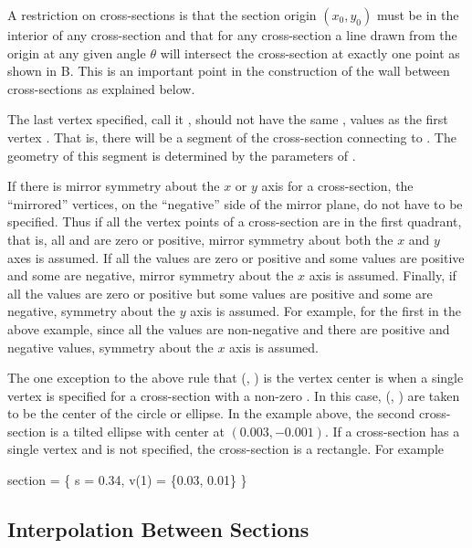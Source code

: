A restriction on cross-sections is that the section origin $(x_0,
y_0)$ must be in the interior of any cross-section and that for any
cross-section a line drawn from the origin at any given angle $\theta$
will intersect the cross-section at exactly one point as shown in
B. This is an important point in the construction
of the wall between cross-sections as explained below.

The last vertex specified, call it , should not have the
same ,  values as the first vertex . That
is, there will be a segment of the cross-section connecting
 to . The geometry of this segment is determined
by the parameters of .

If there is mirror symmetry about the $x$ or $y$ axis for a
cross-section, the ``mirrored'' vertices, on the ``negative'' side of
the mirror plane, do not have to be specified. Thus if all the vertex
points of a cross-section are in the first quadrant, that is, all
 and  are zero or positive, mirror symmetry about both the
$x$ and $y$ axes is assumed. If all the  values are zero or
positive and some  values are positive and some are negative,
mirror symmetry about the $x$ axis is assumed. Finally, if all the
 values are zero or positive but some  values are
positive and some are negative, symmetry about the $y$ axis is
assumed. For example, for the first in the above example, since
all the  values are non-negative and there are positive and
negative  values, symmetry about the $x$ axis is assumed.

The one exception to the above rule that (, ) is the
vertex center is when a single vertex  is specified for a
cross-section with a non-zero . In this case,
(, ) are taken to be the center of the circle or
ellipse. In the example above, the second cross-section is a
tilted ellipse with center at $(0.003, -0.001)$. If a cross-section
has a single vertex and  is
not specified, the cross-section is a rectangle. For example
\begin{example}
    section = \{ s = 0.34, v(1) = \{0.03, 0.01\} \}
\end{example}

\subsection{Interpolation Between Sections}
\label{s:wall.interpolation}

